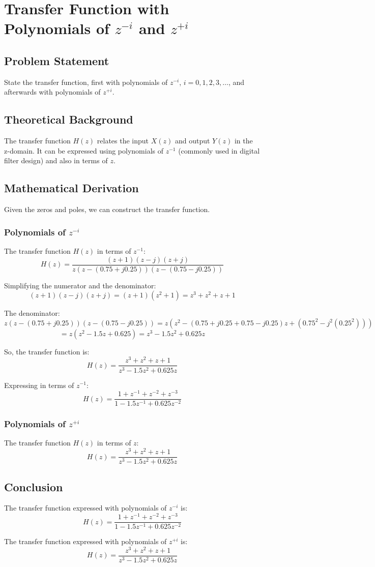 \item[(c)]
\section{Transfer Function with Polynomials of \(z^{-i}\) and \(z^{+i}\)}

\subsection*{Problem Statement}
State the transfer function, first with polynomials of \(z^{-i}\), \(i = 0, 1, 2, 3, \ldots\), and afterwards with polynomials of \(z^{+i}\).

\subsection*{Theoretical Background}
The transfer function \(H(z)\) relates the input \(X(z)\) and output \(Y(z)\) in the z-domain. It can be expressed using polynomials of \(z^{-1}\) (commonly used in digital filter design) and also in terms of \(z\).

\subsection*{Mathematical Derivation}
Given the zeros and poles, we can construct the transfer function.

\subsubsection*{Polynomials of \(z^{-i}\)}
The transfer function \( H(z) \) in terms of \( z^{-1} \):
\[ H(z) = \frac{(z + 1)(z - j)(z + j)}{z(z - (0.75 + j0.25))(z - (0.75 - j0.25))} \]

Simplifying the numerator and the denominator:
\[ (z + 1)(z - j)(z + j) = (z + 1)(z^2 + 1) = z^3 + z^2 + z + 1 \]

The denominator:
\[ z(z - (0.75 + j0.25))(z - (0.75 - j0.25)) = z \left(z^2 - (0.75 + j0.25 + 0.75 - j0.25)z + (0.75^2 - j^2(0.25^2))\right) \]
\[ = z(z^2 - 1.5z + 0.625) = z^3 - 1.5z^2 + 0.625z \]

So, the transfer function is:
\[ H(z) = \frac{z^3 + z^2 + z + 1}{z^3 - 1.5z^2 + 0.625z} \]

Expressing in terms of \( z^{-1} \):
\[ H(z) = \frac{1 + z^{-1} + z^{-2} + z^{-3}}{1 - 1.5z^{-1} + 0.625z^{-2}} \]

\subsubsection*{Polynomials of \(z^{+i}\)}
The transfer function \( H(z) \) in terms of \( z \):
\[ H(z) = \frac{z^3 + z^2 + z + 1}{z^3 - 1.5z^2 + 0.625z} \]

\subsection*{Conclusion}
The transfer function expressed with polynomials of \( z^{-i} \) is:
\[ H(z) = \frac{1 + z^{-1} + z^{-2} + z^{-3}}{1 - 1.5z^{-1} + 0.625z^{-2}} \]

The transfer function expressed with polynomials of \( z^{+i} \) is:
\[ H(z) = \frac{z^3 + z^2 + z + 1}{z^3 - 1.5z^2 + 0.625z} \]
